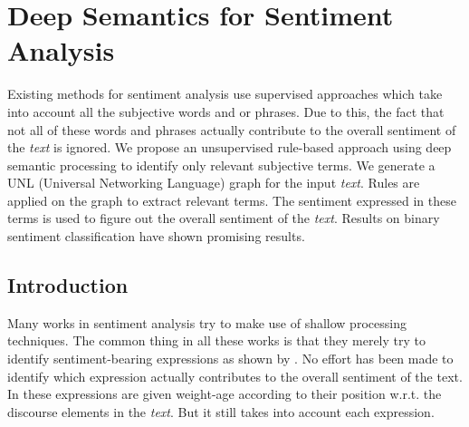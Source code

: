 
\chapter{Deep Semantics for Sentiment Analysis} %

\label{unl} %



Existing methods for sentiment analysis  use supervised approaches which take into account all the subjective words and or phrases. Due to this, the fact that not 
all of these words and phrases actually contribute to the overall sentiment of the \textit{text} is ignored. We propose an unsupervised rule-based approach using 
deep semantic processing to identify only relevant subjective terms. We generate a UNL (Universal Networking Language) graph for the input \textit{text}. Rules are
applied on the graph to extract relevant terms. The sentiment expressed in these terms is used to figure out the overall sentiment of the \textit{text}. Results on
binary sentiment classification have shown promising results.

\section{Introduction}

Many works in sentiment analysis try to make use of shallow processing techniques. The common thing in all these works is that they merely try to identify sentiment-bearing
expressions as shown by \citep*{ruppenhofer2012semantic}. No effort has been made to identify which expression actually contributes to the overall sentiment of the text. 
In \citep*{mukherjee2012sentiment} these expressions are given weight-age according to their position w.r.t. the discourse elements in the \textit{text}. But it still takes into 
account each expression.
 

